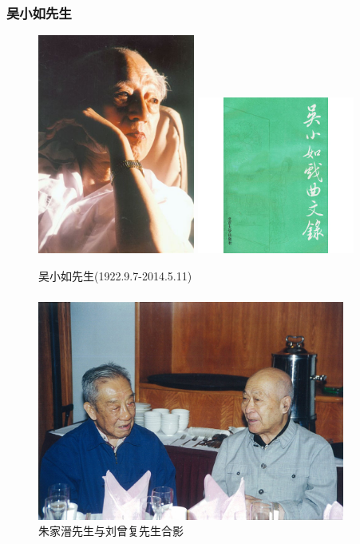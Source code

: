 \documentclass[cjk,slidestop,compress,mathserif,blue]{beamer}
\begin{document}
\frame
{
	\frametitle{吴小如先生}
\begin{figure}[h!]
\centering
\vspace{-0.2in}
\includegraphics[height=0.64\textwidth,width=0.46\textwidth,viewport=0 0 360 520,clip]{Figures/Wu_Xiaoru.jpg}
\hskip 5pt
\includegraphics[height=0.64\textwidth,width=0.46\textwidth,viewport=39 5 200 235,clip]{Figures/Wu_Wenlu.jpg}
\caption{吴小如先生(1922.9.7-2014.5.11)}
\label{Wu_Xiaoru}
\end{figure}
}

\frame
{
	\frametitle{}
\begin{figure}[h!]
\centering
\vspace{-10.5pt}
\includegraphics[height=0.60\textwidth,width=0.9\textwidth,viewport=0 0 510 350,clip]{Figures/Zhu-Liu.jpg}
\caption{\textrm{朱家溍先生与刘曾复先生合影}}
\label{Collect_Zhu-Liu}
\end{figure}
}
\end{document}
